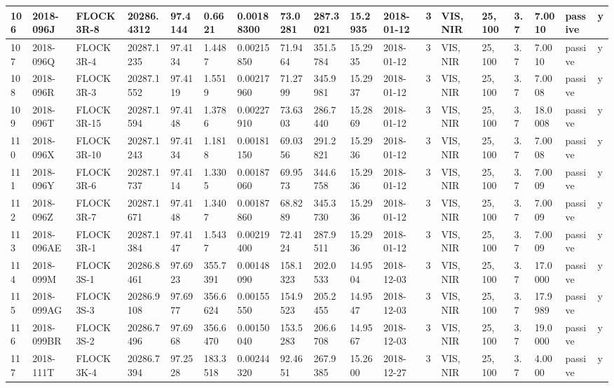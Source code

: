 \documentclass[12pt,a4paper,notitlepage,twoside,openright]{report}
\begin{document}
\begin{longtable}{|l|l|l|l|l|l|l|l|l|l|l|l|l|l|l|l|l|l|}
        106 & 2018-096J & FLOCK 3R-8 & 20286.4312 & 97.4144 & 0.6621 & 0.00188300 & 73.0281 & 287.3021 & 15.2935 & 2018-01-12 & 3 & VIS, NIR & 25, 100 & 3.7 & 7.0010 & passive & y \\ \hline
        107 & 2018-096Q & FLOCK 3R-4 & 20287.1235 & 97.4134 & 1.4487 & 0.00215850 & 71.9464 & 351.5784 & 15.2935 & 2018-01-12 & 3 & VIS, NIR & 25, 100 & 3.7 & 7.0010 & passive & y \\ \hline
        108 & 2018-096R & FLOCK 3R-3 & 20287.1552 & 97.4119 & 1.5519 & 0.00217960 & 71.2799 & 345.9981 & 15.2937 & 2018-01-12 & 3 & VIS, NIR & 25, 100 & 3.7 & 7.0008 & passive & y \\ \hline
        109 & 2018-096T & FLOCK 3R-15 & 20287.1594 & 97.4148 & 1.3786 & 0.00227910 & 73.6303 & 286.7440 & 15.2869 & 2018-01-12 & 3 & VIS, NIR & 25, 100 & 3.7 & 18.0008 & passive & y \\ \hline
        110 & 2018-096X & FLOCK 3R-10 & 20287.1243 & 97.4134 & 1.1818 & 0.00181150 & 69.0356 & 291.2821 & 15.2936 & 2018-01-12 & 3 & VIS, NIR & 25, 100 & 3.7 & 7.0008 & passive & y \\ \hline
        111 & 2018-096Y & FLOCK 3R-6 & 20287.1737 & 97.4114 & 1.3305 & 0.00187060 & 69.9573 & 344.6758 & 15.2936 & 2018-01-12 & 3 & VIS, NIR & 25, 100 & 3.7 & 7.0009 & passive & y \\ \hline
        112 & 2018-096Z & FLOCK 3R-7 & 20287.1671 & 97.4148 & 1.3407 & 0.00187860 & 68.8289 & 345.3730 & 15.2936 & 2018-01-12 & 3 & VIS, NIR & 25, 100 & 3.7 & 7.0009 & passive & y \\ \hline
        113 & 2018-096AE & FLOCK 3R-1 & 20287.1384 & 97.4147 & 1.5437 & 0.00219400 & 72.4124 & 287.9511 & 15.2936 & 2018-01-12 & 3 & VIS, NIR & 25, 100 & 3.7 & 7.0009 & passive & y \\ \hline
        114 & 2018-099M & FLOCK 3S-1 & 20286.8461 & 97.6923 & 355.7391 & 0.00148090 & 158.1323 & 202.0533 & 14.9504 & 2018-12-03 & 3 & VIS, NIR & 25, 100 & 3.7 & 17.0000 & passive & y \\ \hline
        115 & 2018-099AG & FLOCK 3S-3 & 20286.9108 & 97.6977 & 356.6624 & 0.00155550 & 154.9523 & 205.2455 & 14.9547 & 2018-12-03 & 3 & VIS, NIR & 25, 100 & 3.7 & 17.9989 & passive & y \\ \hline
        116 & 2018-099BR & FLOCK 3S-2 & 20286.7496 & 97.6968 & 356.6470 & 0.00150040 & 153.5283 & 206.6708 & 14.9567 & 2018-12-03 & 3 & VIS, NIR & 25, 100 & 3.7 & 19.0000 & passive & y \\ \hline
        117 & 2018-111T & FLOCK 3K-4 & 20286.7394 & 97.2528 & 183.3518 & 0.00244320 & 92.4651 & 267.9385 & 15.2600 & 2018-12-27 & 3 & VIS, NIR & 25, 100 & 3.7 & 4.0000 & passive & y \\ \hline

\end{longtable}
\end{document}

